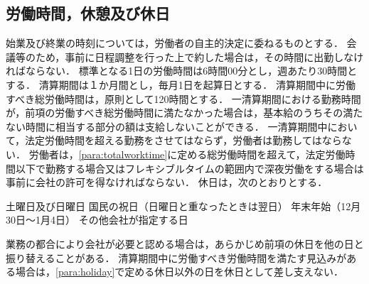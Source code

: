 \documentclass[11pt,a4paper]{jsarticle}
\begin{document}
\subsection{労働時間，休憩及び休日}
始業及び終業の時刻については，労働者の自主的決定に委ねるものとする．
\term
会議等のため，事前に日程調整を行った上で約した場合は，その時間に出勤しなければならない．
標準となる1日の労働時間は6時間00分とし，週あたり30時間とする．
清算期間は１か月間とし，毎月1日を起算日とする． 
\term
清算期間中に労働すべき総労働時間は，原則として120時間とする．
\term
一清算期間における勤務時間が，前項の労働すべき総労働時間に満たなかった場合は，基本給のうちその満たない時間に相当する部分の額は支給しないことができる．
\label{para:totalworktime}
\term
一清算期間中において，法定労働時間を超える勤務をさせてはならず，労働者は勤務してはならない．
\term
労働者は，\ref{para:totalworktime}に定める総労働時間を超えて，法定労働時間以下で勤務する場合又はフレキシブルタイムの範囲内で深夜労働をする場合は事前に会社の許可を得なければならない．
休日は，次のとおりとする．
\label{para:holiday}
\begin{enumerate}
	\itm 土曜日及び日曜日
	\itm 国民の祝日（日曜日と重なったときは翌日）
	\itm 年末年始（12月30日～1月4日）
	\itm その他会社が指定する日
\end{enumerate}
\term
業務の都合により会社が必要と認める場合は，あらかじめ前項の休日を他の日と振り替えることがある．
\term
清算期間中に労働すべき労働時間を満たす見込みがある場合は，\ref{para:holiday}で定める休日以外の日を休日として差し支えない． 
\end{document}
